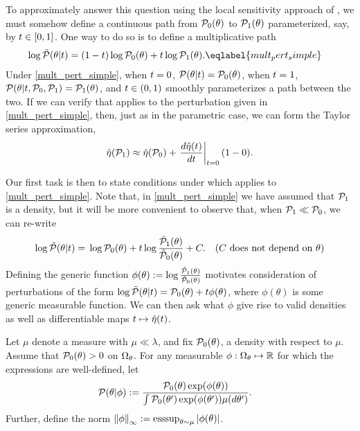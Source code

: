 To approximately answer this question using the local sensitivity approach of
, we must somehow define a continuous path from
$\mathcal{P}_{0}(\theta)$ to $\mathcal{P}_{1}(\theta)$ parameterized, say, by $t \in [0, 1]$. One
way to do so is to define a multiplicative path
%
\begin{align}
%
\log \ptil(\theta \vert \t) ={}&
    (1 - \t)\log \pbase(\theta) + \t \log \palt(\theta).
        \eqlabel{mult_pert_simple}
%
\end{align}
%
Under \eqref{mult_pert_simple}, when $t=0$, $\mathcal{P}(\theta \vert t) =
\mathcal{P}_{0}(\theta)$, when $t=1$, $\mathcal{P}(\theta \vert t, \mathcal{P}_{0}, \mathcal{P}_{1}) =
\mathcal{P}_{1}(\theta)$, and $t \in (0,1)$ smoothly parameterizes a path between the
two.  If we can verify that  applies to the perturbation
given in \eqref{mult_pert_simple}, then, just as in the parametric case, we can
form the Taylor series approximation,
%
\begin{align*}
%
\etaopt(\palt) \approx
    \etaopt(\pbase) + \fracat{d \etaopt(\t)}{d\t}{\t=0} (1 - 0).
%
\end{align*}

Our first task is then to state conditions under which 
applies to \eqref{mult_pert_simple}.  Note that, in \eqref{mult_pert_simple} we
have assumed that $\mathcal{P}_{1}$ is a density, but it will be more convenient to
observe that, when $\mathcal{P}_{1} \ll \mathcal{P}_{0}$, we can re-write
%
\begin{align*}
%
\log \ptil(\theta \vert \t) ={}&
    \log \pbase(\theta) +
        \t \log \frac{\palttil(\theta)}{\pbasetil(\theta)} +
        \const. & \constdesc{\theta}
%
\end{align*}
%
Defining the generic function $\phi(\theta) := \log
\frac{\tilde{\mathcal{P}}_{1}(\theta)}{\tilde{\mathcal{P}}_{0}(\theta)}$ motivates consideration of
perturbations of the form $\log \tilde{\mathcal{P}}(\theta \vert t) = \mathcal{P}_{0}(\theta) + t
\phi(\theta)$, where $\phi(\theta)$ is some generic measurable function. We can
then ask what $\phi$ give rise to valid densities as well as differentiable maps
$t \mapsto \hat\eta(t)$.

\begin{defn}
%
Let $\mu$ denote a measure with $\mu \ll \lambda$, and fix $\mathcal{P}_{0}(\theta)$, a
density with respect to $\mu$.  Assume that $\mathcal{P}_{0}(\theta) > 0$ on $\Omega_{\theta}$.
For any measurable $\phi: \Omega_{\theta} \mapsto \mathbb{R}$ for which the
expressions are well-defined, let
%
\begin{align*}
\p(\theta \vert \phi) :={}&
\frac{\pbase(\theta)\exp(\phi(\theta))}
     {\int \pbase(\theta')\exp(\phi(\theta')) \mu(d \theta')}.
%
\end{align*}
%
Further, define the norm $\left\Vert\phi\right\Vert_{\infty} := \operatorname*{\mathrm{esssup}}_{\theta \sim \mu}
\left|\phi(\theta)\right|$.
%
\end{defn}
%


